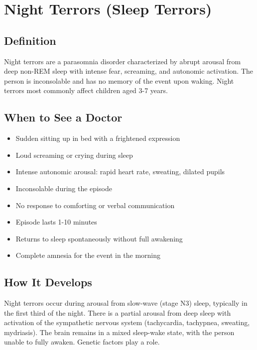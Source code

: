 \chapter{Night Terrors (Sleep Terrors)}

\section*{Definition}
Night terrors are a parasomnia disorder characterized by abrupt arousal from deep non-REM sleep with intense fear, screaming, and autonomic activation. The person is inconsolable and has no memory of the event upon waking. Night terrors most commonly affect children aged 3-7 years.

\section*{When to See a Doctor}
\begin{itemize}
\item Sudden sitting up in bed with a frightened expression
\item Loud screaming or crying during sleep
\item Intense autonomic arousal: rapid heart rate, sweating, dilated pupils
\item Inconsolable during the episode
\item No response to comforting or verbal communication
\item Episode lasts 1-10 minutes
\item Returns to sleep spontaneously without full awakening
\item Complete amnesia for the event in the morning
\end{itemize}

\section*{How It Develops}
Night terrors occur during arousal from slow-wave (stage N3) sleep, typically in the first third of the night. There is a partial arousal from deep sleep with activation of the sympathetic nervous system (tachycardia, tachypnea, sweating, mydriasis). The brain remains in a mixed sleep-wake state, with the person unable to fully awaken. Genetic factors play a role.

